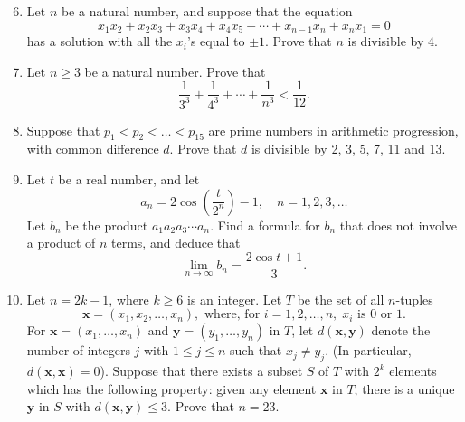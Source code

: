 \documentclass[12pt]{article}
\begin{document}
\begin{enumerate}
\setcounter{enumi}{5}
\item Let $n$ be a natural number, and suppose that the equation \[x_1x_2 + x_2x_3 + x_3x_4 + x_4x_5 + \cdots + x_{n-1}x_n + x_nx_1 = 0\] has a solution with all the $x_i$'s equal to $\pm 1$. Prove that $n$ is divisible by 4.

\item Let $n \ge 3$ be a natural number. Prove that \[\frac{1}{3^3} + \frac{1}{4^3} + \cdots + \frac{1}{n^3} < \frac{1}{12}.\]

\item Suppose that $p_1 < p_2 < \ldots < p_{15}$ are prime numbers in arithmetic progression, with common difference $d$. Prove that $d$ is divisible by 2, 3, 5, 7, 11 and 13.

\item Let $t$ be a real number, and let \[a_n = 2\cos\left(\frac{t}{2^n}\right) - 1, \quad n = 1, 2, 3, \ldots\] Let $b_n$ be the product $a_1a_2a_3\cdots a_n$. Find a formula for $b_n$ that does not involve a product of $n$ terms, and deduce that \[\lim_{n\to\infty} b_n = \frac{2\cos t + 1}{3}.\]

\item Let $n = 2k - 1$, where $k \ge 6$ is an integer. Let $T$ be the set of all $n$-tuples \[\mathbf{x} = (x_1, x_2, \ldots, x_n), \text{ where, for } i = 1, 2, \ldots, n, \; x_i \text{ is 0 or 1.}\] For $\mathbf{x} = (x_1, \ldots, x_n)$ and $\mathbf{y} = (y_1, \ldots, y_n)$ in $T$, let $d(\mathbf{x}, \mathbf{y})$ denote the number of integers $j$ with $1 \le j \le n$ such that $x_j \ne y_j$. (In particular, $d(\mathbf{x}, \mathbf{x}) = 0$). Suppose that there exists a subset $S$ of $T$ with $2^k$ elements which has the following property: given any element $\mathbf{x}$ in $T$, there is a unique $\mathbf{y}$ in $S$ with $d(\mathbf{x}, \mathbf{y}) \le 3$. Prove that $n = 23$.

\end{enumerate}
\end{document}
